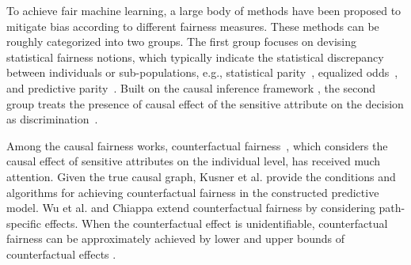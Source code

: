 \documentclass{article}
\begin{document}
To achieve fair machine learning, a large body of methods have been proposed to mitigate bias according to different fairness measures. These methods can be roughly categorized into two groups. 
The first group focuses on devising statistical fairness notions, which typically indicate the statistical discrepancy between individuals or sub-populations, e.g., statistical parity~\citep{dwork2012fairness}, equalized odds~\citep{hardt2016equality}, and predictive parity~\citep{chouldechova2017fair}. 
Built on the causal inference framework \citep{pearl2000models}, the second group treats the presence of causal effect of the sensitive attribute on the decision as discrimination~\citep{zhang2017causal,kilbertus2017avoiding, kusner2017counterfactual, zhang2018fairness, zhang2018equality,nabi2018fair,wu2019pc,khademi2019fairness,chiappa2019path, russell2017worlds, zhang2018causal, zhang2017anti, kusner2019making, salimi2019interventional, wu2018discrimination, galhotra2022causal}. %

Among the causal fairness works, counterfactual fairness~\citep{kusner2017counterfactual}, which considers
the causal effect of sensitive attributes on the individual level, has received much attention. Given the true causal graph, Kusner et al. \citep{kusner2017counterfactual} provide the conditions and algorithms for achieving counterfactual fairness in the constructed predictive model. Wu et al. \citep{wu2019pc} and Chiappa \citep{chiappa2019path} extend counterfactual fairness by considering path-specific effects. When the counterfactual effect is unidentifiable, counterfactual fairness can be approximately achieved by lower
and upper bounds of counterfactual effects \citep{wu2019counterfactual}.
\end{document}
